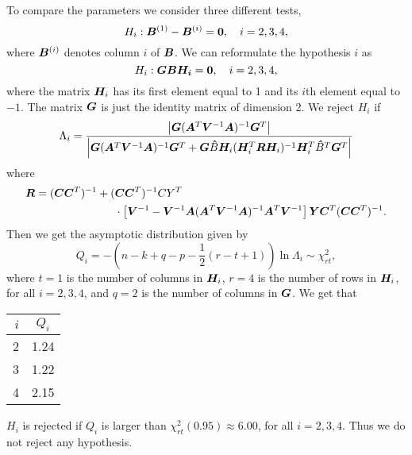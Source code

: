 To compare the parameters we consider three different tests,
\begin{equation*}
  H_i: \bm{B}^{(1)} - \bm{B}^{(i)} = \bm{0},\quad i = 2,3,4,
\end{equation*}
where $\bm{B}^{(i)}$ denotes column $i$ of $\bm{B}$. We can reformulate the
hypothesis $i$ as
\begin{equation*}
  H_i: \bm{G B H_i} = \bm{0}, \quad i = 2,3,4,
\end{equation*}
where the matrix $\bm{H}_i$ has its first element equal to 1 and its $i$th element
equal to $-1$. The matrix $\bm{G}$ is just the identity matrix of
dimension 2. We reject $H_{i}$ if 
\begin{equation*}
  \Lambda_{i} = \frac{\left| \bm{G} (\bm{A}^{T} \bm{V}^{-1} \bm{A})^{-1}\bm{G}^{T} \right|}
  {\left| \bm{G} (\bm{A}^{T} \bm{V}^{-1} \bm{A})^{-1} \bm{G} ^{T} + \bm{G} \bm{\hat} B\bm{H}_{i}(\bm{H}_{i}^{T} \bm{R} \bm{H}_{i})^{-1}\bm{H}_{i}^{T} \bm{\hat} B^{T} \bm{G}^{T} \right|}
\end{equation*}
where
\begin{align*}
  \bm{R} = (\bm{C} \bm{C}^{T})^{-1} + ( &\bm{C} \bm{C}^{T})^{-1} CY^{T} \\
 &  \cdot\left[
    \bm{V}^{-1}  - \bm{V}^{-1}\bm{A}(\bm{A}^{T} \bm{V}^{-1} \bm{A})^{-1}\bm{A}^{T} \bm{V}^{-1}
  \right] 
  \bm{Y} \bm{C}^{T}(\bm{C} \bm{C}^{T})^{-1}.
\end{align*}
Then we get the  asymptotic distribution given by
\begin{equation*}
 Q_{i} = - \left(n - k + q - p - \frac{1}{2}(r - t + 1)\right) \ln \Lambda_{i} \sim \chi^{2}_{rt}, 
\end{equation*}
where $t=1$ is the number of columns in $\bm{H}_{i}$, $r = 4$ is the
number of rows in $\bm{H}_{i}$, for all $i = 2,3,
4$, and $q = 2$ is the number of columns in $\bm{G}$. We get that
\begin{center}
  \begin{tabular}{r|c}
    $i$   & $Q_{i}$   \\ \hline
    2   & 1.24 \\
    3   & 1.22 \\
    4   & 2.15 \\
  \end{tabular}
\end{center}
$H_{i}$ is rejected  if $Q_{i}$ is larger than
$\chi^{2}_{rt}(0.95) \approx 6.00$, for all $i = 2,3,4$. Thus we do not reject any hypothesis. 
